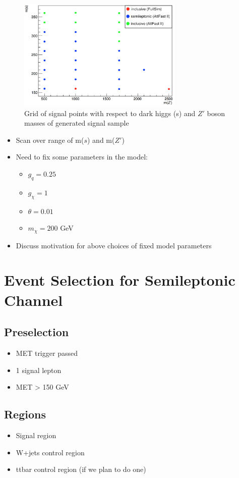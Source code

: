 \documentclass[12pt]{article}
\begin{document}
\begin{figure}[H]
	\centering
	\includegraphics[width=0.7\textwidth]{figures/SignalGrid.png}
	\caption[]{Grid of signal points with respect to dark higgs (s) and $Z'$ boson masses of generated signal sample}
	\label{fig:signalgrid}
\end{figure}

\begin{itemize}
	\item Scan over range of m($s$) and m($Z'$)
	\item Need to fix some parameters in the model:
	\begin{itemize}
		\item $g_{q} = 0.25$
		\item $g_{\chi} = 1$
		\item $\theta = 0.01$
		\item $m_{\chi} = 200$ GeV
	\end{itemize}
	\item Discuss motivation for above choices of fixed model parameters
\end{itemize}

\section{Event Selection for Semileptonic Channel}

\subsection{Preselection}
\begin{itemize}
\item MET trigger passed
\item 1 signal lepton
\item MET > 150 GeV
\end{itemize}
\subsection{Regions}
\begin{itemize}
\item Signal region
\item W+jets control region
\item ttbar control region (if we plan to do one)
\end{itemize}
\end{document}
